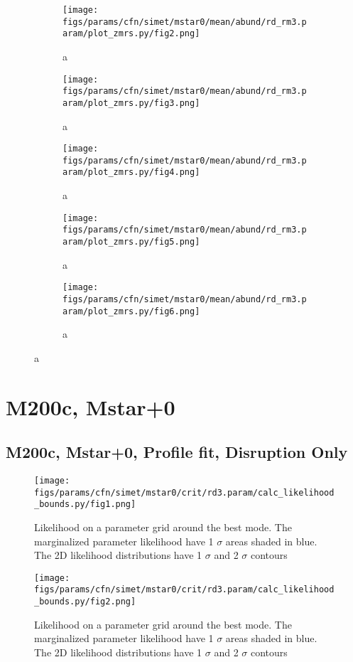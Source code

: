 \documentclass[twocolumn]{article}
\begin{document}
\begin{figure}
  \begin{subfigure}{.5\textwidth}
    \centering\texttt{[image: figs/params/cfn/simet/mstar0/mean/abund/rd\_rm3.param/plot\_zmrs.py/fig2.png]}
    \caption{a}
  \end{subfigure}
  \begin{subfigure}{.5\textwidth}
    \centering\texttt{[image: figs/params/cfn/simet/mstar0/mean/abund/rd\_rm3.param/plot\_zmrs.py/fig3.png]}
    \caption{a}
  \end{subfigure}
  \begin{subfigure}{.5\textwidth}
    \centering\texttt{[image: figs/params/cfn/simet/mstar0/mean/abund/rd\_rm3.param/plot\_zmrs.py/fig4.png]}
    \caption{a}
  \end{subfigure}%
  \begin{subfigure}{.5\textwidth}
    \centering\texttt{[image: figs/params/cfn/simet/mstar0/mean/abund/rd\_rm3.param/plot\_zmrs.py/fig5.png]}
    \caption{a}
  \end{subfigure}
  \begin{subfigure}{.5\textwidth}
    \centering\texttt{[image: figs/params/cfn/simet/mstar0/mean/abund/rd\_rm3.param/plot\_zmrs.py/fig6.png]}
    \caption{a}
  \end{subfigure}
\end{figure}
\clearpage



\section{M200c, Mstar+0}
\subsection{M200c, Mstar+0, Profile fit, Disruption Only}
\begin{figure}[H]
  \center\texttt{[image: figs/params/cfn/simet/mstar0/crit/rd3.param/calc\_likelihood\_bounds.py/fig1.png]}
  \caption{Likelihood on a parameter grid around the best mode. The marginalized parameter likelihood have
    1 $\sigma$ areas shaded in blue. The 2D likelihood distributions have 1 $\sigma$  and 2 $\sigma$ contours}
  \label{fig:basic_rd:likelihood}
\end{figure}

\begin{figure}[H]
  \center\texttt{[image: figs/params/cfn/simet/mstar0/crit/rd3.param/calc\_likelihood\_bounds.py/fig2.png]}
  \caption{Likelihood on a parameter grid around the best mode. The marginalized parameter likelihood have
    1 $\sigma$ areas shaded in blue. The 2D likelihood distributions have 1 $\sigma$  and 2 $\sigma$ contours}
  \label{fig:basic_rd:likelihood}
\end{figure}
\end{document}
